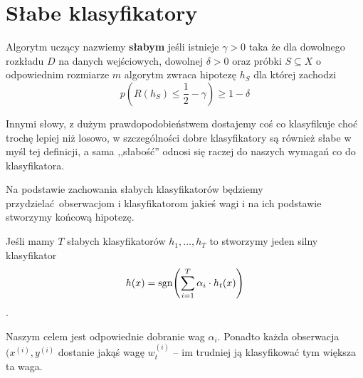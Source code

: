 \section{Słabe klasyfikatory}

\begin{definition}
	Algorytm uczący nazwiemy \textbf{słabym} jeśli istnieje \( \gamma > 0 \) taka że dla dowolnego rozkładu \( D \) na danych wejściowych, dowolnej \( \delta > 0 \) oraz próbki \( S \subseteq X \) o odpowiednim rozmiarze \( m \) algorytm zwraca hipotezę \( h_S \) dla której zachodzi
	\[
		p(R(h_S) \leq \frac{1}{2} - \gamma) \geq 1 - \delta
	\]
\end{definition}

Innymi słowy, z dużym prawdopodobieństwem dostajemy coś co klasyfikuje choć trochę lepiej niż losowo, w szczególności dobre klasyfikatory są również słabe w myśl tej definicji, a sama ,,słabość'' odnosi się raczej do naszych wymagań co do klasyfikatora.

Na podstawie zachowania słabych klasyfikatorów będziemy przydzielać obserwacjom i klasyfikatorom jakieś wagi i na ich podstawie stworzymy końcową hipotezę.

Jeśli mamy \( T \) słabych klasyfikatorów \( h_1, \dots, h_T \) to stworzymy jeden silny klasyfikator
\[
	h(x) = \sgn\pars{\sum_{i = 1}^T \alpha_i \cdot h_t(x)}
\].

Naszym celem jest odpowiednie dobranie wag \( \alpha_i \).
Ponadto każda obserwacja \( (x^{(i)}, y^{(i)} \) dostanie jakąś wagę \( w^{(i)}_t \) -- im trudniej ją klasyfikować tym większa ta waga.

